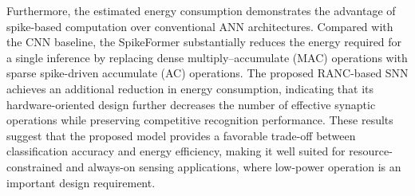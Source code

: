 \documentclass[../main.tex]{subfiles}
\begin{document}
Furthermore, the estimated energy consumption demonstrates the advantage of
spike-based computation over conventional ANN architectures. Compared with the
CNN baseline, the SpikeFormer substantially reduces the energy required for a
single inference by replacing dense multiply--accumulate (MAC) operations with
sparse spike-driven accumulate (AC) operations. The proposed RANC-based SNN
achieves an additional reduction in energy consumption, indicating that its
hardware-oriented design further decreases the number of effective synaptic
operations while preserving competitive recognition performance. These results
suggest that the proposed model provides a favorable trade-off between
classification accuracy and energy efficiency, making it well suited for
resource-constrained and always-on sensing applications, where low-power
operation is an important design requirement.
\end{document}
